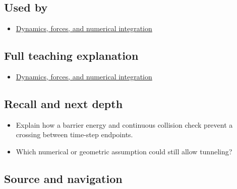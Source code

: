 \subsection{Used by}\label{used-by}

\begin{itemize}
\tightlist
\item
  \href{Continuous\%20Notes/University\%20-\%20Worlds,\%20Images\%20and\%20Inference\%20-\%20Graphics,\%20Vision\%20and\%20Photography\#Dynamics,\%20forces,\%20and\%20numerical\%20integration}{Dynamics, forces, and numerical integration}
\end{itemize}

\subsection{Full teaching explanation}\label{full-teaching-explanation}

\begin{itemize}
\tightlist
\item
  \href{Continuous\%20Notes/University\%20-\%20Worlds,\%20Images\%20and\%20Inference\%20-\%20Graphics,\%20Vision\%20and\%20Photography\#Dynamics,\%20forces,\%20and\%20numerical\%20integration}{Dynamics, forces, and numerical integration}
\end{itemize}

\subsection{Recall and next depth}\label{recall-and-next-depth}

\begin{itemize}
\tightlist
\item
  Explain how a barrier energy and continuous collision check prevent a crossing between time-step endpoints.
\item
  Which numerical or geometric assumption could still allow tunneling?
\end{itemize}

\subsection{Source and navigation}\label{source-and-navigation}

